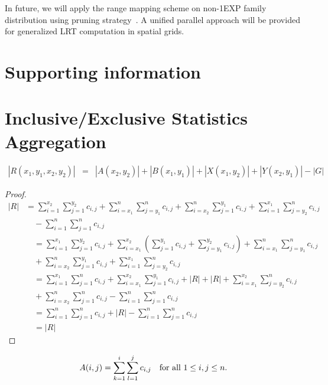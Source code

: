 \documentclass[AMA,LATO1COL]{WileyNJD-v2}
\begin{document}
In future, we will apply the range mapping scheme on non-1EXP family distribution using pruning strategy~\cite{jour}. A unified parallel approach will be provided for generalized LRT computation in spatial grids.

\section*{Supporting information}

\section{Inclusive/Exclusive Statistics Aggregation }

\begin{eqnarray}
|R(x_1,y_1,x_2,y_2)|&= & |A(x_2,y_2)| + |B(x_1,y_1)| + |X(x_1,y_2)| +|Y(x_2,y_1)| - |G|
\end{eqnarray}

\begin{proof}
\begin{eqnarray}
|R|&=\sum_{i=1}^{x_2}\sum_{j=1}^{y_2}c_{i,j}+\sum_{i={x_1}}^{n}\sum_{j={y_1}}^{n}c_{i,j}+\sum_{i={x_2}}^{n}\sum_{j=1}^{y_1}c_{i,j}+\sum_{i=1}^{x_1}\sum_{j={y_2}}^{n}c_{i,j}\\& \quad-\sum_{i=1}^{n}\sum_{j=1}^{n}c_{i,j}\\&\quad=\sum_{i=1}^{x_1}\sum_{j=1}^{y_2}c_{i,j}+\sum_{i={x_1}}^{x_2}(\sum_{j=1}^{y_1}c_{i,j}+\sum_{j={y_1}}^{y_2}c_{i,j})+\sum_{i={x_1}}^{n}\sum_{j={y_1}}^{n}c_{i,j}\\& \quad +\sum_{i={x_2}}^{n}\sum_{j=1}^{y_1}c_{i,j}+\sum_{i=1}^{x_1}\sum_{j={y_2}}^{n}c_{i,j}\\&\quad=\sum_{i=1}^{x_1}\sum_{j=1}^{n}c_{i,j}+\sum_{i={x_1}}^{x_2}\sum_{j=1}^{y_1}c_{i,j}+|R|+|R|+\sum_{i={x_1}}^{x_2}\sum_{j={y_2}}^{n}c_{i,j}\\&\quad+\sum_{i={x_2}}^n\sum_{j=1}^{n}c_{i,j}-\sum_{i=1}^n\sum_{j=1}^{n}c_{i,j}
\\&\quad =\sum_{i=1}^n\sum_{j=1}^{n}c_{i,j}+|R|-\sum_{i=1}^n\sum_{j=1}^{n}c_{i,j}\\&\quad =|R|
\end{eqnarray}
\end{proof}

\begin{definition}
\begin{eqnarray}
A(i,j)=\sum_{k=1}^{i}\sum_{l=1}^{j}c_{i,j}\mbox{\quad for all $1\leq i,j\leq n$}.
\end{eqnarray}
\end{definition}
\end{document}
